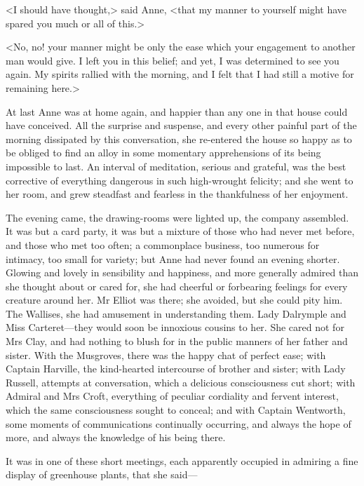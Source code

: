 <I should have thought,> said Anne, <that my manner to yourself might have spared you much or all of this.>

<No, no! your manner might be only the ease which your engagement to another man would give. I left you in this belief; and yet, I was determined to see you again. My spirits rallied with the morning, and I felt that I had still a motive for remaining here.>

At last Anne was at home again, and happier than any one in that house could have conceived. All the surprise and suspense, and every other painful part of the morning dissipated by this conversation, she re-entered the house so happy as to be obliged to find an alloy in some momentary apprehensions of its being impossible to last. An interval of meditation, serious and grateful, was the best corrective of everything dangerous in such high-wrought felicity; and she went to her room, and grew steadfast and fearless in the thankfulness of her enjoyment.

The evening came, the drawing-rooms were lighted up, the company assembled. It was but a card party, it was but a mixture of those who had never met before, and those who met too often; a commonplace business, too numerous for intimacy, too small for variety; but Anne had never found an evening shorter. Glowing and lovely in sensibility and happiness, and more generally admired than she thought about or cared for, she had cheerful or forbearing feelings for every creature around her. Mr Elliot was there; she avoided, but she could pity him. The Wallises, she had amusement in understanding them. Lady Dalrymple and Miss Carteret—they would soon be innoxious cousins to her. She cared not for Mrs Clay, and had nothing to blush for in the public manners of her father and sister. With the Musgroves, there was the happy chat of perfect ease; with Captain Harville, the kind-hearted intercourse of brother and sister; with Lady Russell, attempts at conversation, which a delicious consciousness cut short; with Admiral and Mrs Croft, everything of peculiar cordiality and fervent interest, which the same consciousness sought to conceal; and with Captain Wentworth, some moments of communications continually occurring, and always the hope of more, and always the knowledge of his being there.

It was in one of these short meetings, each apparently occupied in admiring a fine display of greenhouse plants, that she said—

